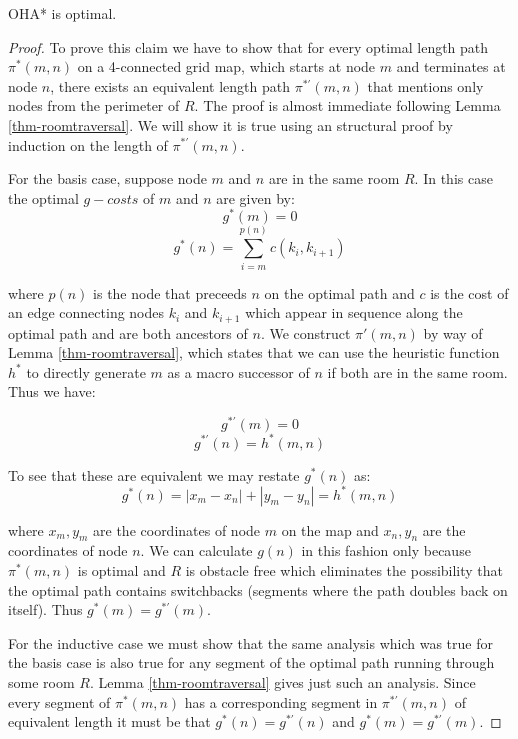 \begin{mytheorem}
OHA* is optimal. 
\end{mytheorem}
\begin{proof}
To prove this claim we have to show that for every optimal length path $\pi^*(m, n)$ 
on a 4-connected grid map, which starts at node $m$ and terminates at node $n$, 
there exists an equivalent length path $\pi^{*'}(m, n)$ that mentions only nodes from the
perimeter of $R$.
The proof is almost immediate following Lemma \ref{thm-roomtraversal}. 
We will show it is true using an structural proof by induction on the length
of $\pi^{*'}(m, n)$.
\par
For the basis case, suppose node $m$ and $n$ are in the same room $R$.
In this case the optimal $g-costs$ of $m$ and $n$ are given by:
$$g^*(m) = 0$$
$$ g^*(n) =  \sum_{i = m}^{p(n)}c(k_{i}, k_{i+1})$$ 

where $p(n)$ is the node that preceeds $n$ on the optimal path and $c$ is the cost of 
an edge connecting nodes $k_{i}$ and $k_{i+1}$ which appear in sequence along the optimal path 
and are both ancestors of $n$.
We construct $\pi'(m, n)$ by way of Lemma \ref{thm-roomtraversal}, 
which states that we can use the heuristic function $h^*$ to directly generate $m$ as a 
macro successor of $n$ if both are in the same room.
Thus we have:

$$ g^{*'}(m) = 0 $$
$$ g^{*'}(n) = h^*(m, n)$$

To see that these are equivalent we may restate $g^*(n)$ as:
$$g^*(n) = |x_{m} - x_{n}| + |y_{m} - y_{n}| = h^*(m, n)$$

where $x_{m}, y_{m}$ are the coordinates of node $m$ on the map and $x_{n}, y_{n}$ are
the coordinates of node $n$.
We can calculate $g(n)$ in this fashion only because $\pi^*(m,n)$ is optimal and $R$ is
obstacle free which eliminates the possibility that the optimal path contains
 switchbacks (segments where the path doubles back on itself).
Thus $g^{*}(m) = g^{*'}(m)$.
\par
For the inductive case we must show that the same analysis which was true for the basis case
is also true for any segment of the optimal path running through some room $R$. 
Lemma \ref{thm-roomtraversal} gives just such an analysis.
Since every segment of $\pi^{*}(m, n)$ has a corresponding segment in $\pi^{*'}(m, n)$ of equivalent
length it must be that $g^*(n) = g^{*'}(n)$ and $g^*(m) = g^{*'}(m)$.
\end{proof}


